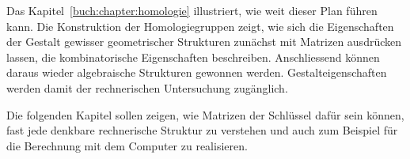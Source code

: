 Das Kapitel~\ref{buch:chapter:homologie} illustriert, wie weit dieser
Plan führen kann.
Die Konstruktion der Homologiegruppen zeigt, wie sich die Eigenschaften
%
der Gestalt gewisser geometrischer Strukturen zunächst mit Matrizen
ausdrücken lassen,
die kombinatorische Eigenschaften beschreiben.
Anschliessend können daraus wieder algebraische Strukturen gewonnen
werden.
Gestalteigenschaften werden damit der rechnerischen Untersuchung zugänglich.

Die folgenden Kapitel sollen zeigen, wie Matrizen der Schlüssel dafür
sein können, fast jede denkbare rechnerische Struktur zu verstehen und
auch zum Beispiel für die Berechnung mit dem Computer zu realisieren.




